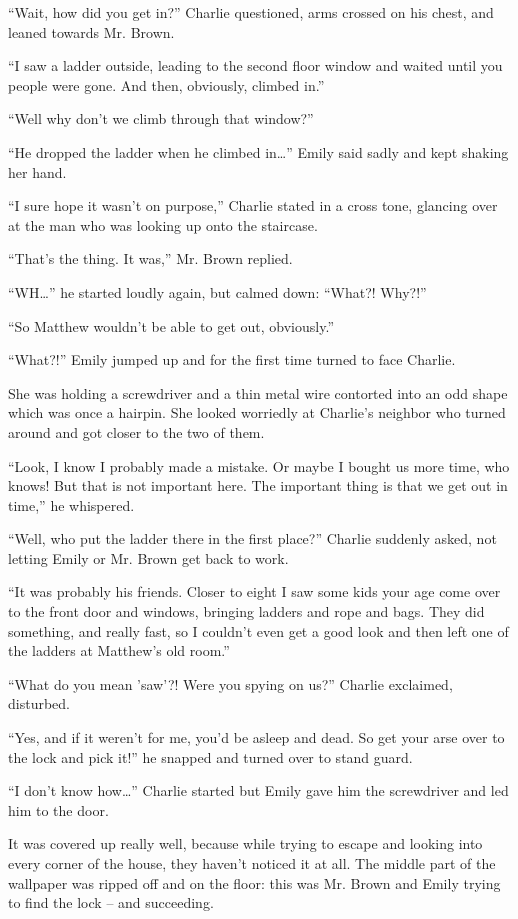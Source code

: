 “Wait, how did you get in?” Charlie questioned, arms crossed on his chest, and leaned towards Mr. Brown.

“I saw a ladder outside, leading to the second floor window and waited until you people were gone. And then, obviously, climbed in.”

“Well why don't we climb through that window?”

“He dropped the ladder when he climbed in…” Emily said sadly and kept shaking her hand.

“I sure hope it wasn't on purpose,” Charlie stated in a cross tone, glancing over at the man who was looking up onto the staircase.

“That's the thing. It was,” Mr. Brown replied.

“WH…” he started loudly again, but calmed down: “What?! Why?!”

“So Matthew wouldn't be able to get out, obviously.”

“What?!” Emily jumped up and for the first time turned to face Charlie.

She was holding a screwdriver and a thin metal wire contorted into an odd shape which was once a hairpin. She looked worriedly at Charlie's neighbor who turned around and got closer to the two of them.

“Look, I know I probably made a mistake. Or maybe I bought us more time, who knows! But that is not important here. The important thing is that we get out in time,” he whispered.

“Well, who put the ladder there in the first place?” Charlie suddenly asked, not letting Emily or Mr. Brown get back to work.

“It was probably his friends. Closer to eight I saw some kids your age come over to the front door and windows, bringing ladders and rope and bags. They did something, and really fast, so I couldn't even get a good look and then left one of the ladders at Matthew's old room.”

“What do you mean 'saw'?! Were you spying on us?” Charlie exclaimed, disturbed.

“Yes, and if it weren't for me, you'd be asleep and dead. So get your arse over to the lock and pick it!” he snapped and turned over to stand guard.

“I don't know how…” Charlie started but Emily gave him the screwdriver and led him to the door.

It was covered up really well, because while trying to escape and looking into every corner of the house, they haven't noticed it at all. The middle part of the wallpaper was ripped off and on the floor: this was Mr. Brown and Emily trying to find the lock – and succeeding.

